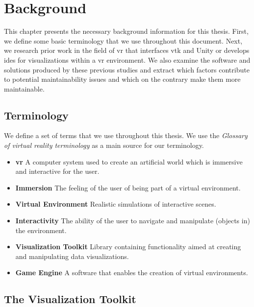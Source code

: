 \chapter{Background}
\label{ch:background}

This chapter presents the necessary background information for this thesis. First, we define some basic terminology that we use throughout this document. Next, we research prior work in the field of \acrshort{vr} that interfaces \acrshort{vtk} and Unity or develops \acrshort{ide}s for visualizations within a \acrshort{vr} environment. We also examine the software and solutions produced by these previous studies and extract which factors contribute to potential maintainability issues and which on the contrary make them more maintainable. 

\section{Terminology}

We define a set of terms that we use throughout this thesis. We use the \textit{Glossary of virtual reality terminology} \cite{manetta1995glossary} as a main source for our terminology.

\begin{itemize}[leftmargin=1.5truecm]
    \setlength{\itemindent}{-1truecm}
    \item[] \textbf{\acrfull{vr}} A computer system used to create an artificial world which is immersive and interactive for the user.
    \item[] \textbf{Immersion} The feeling of the user of being part of a virtual environment.
    \item[] \textbf{Virtual Environment} Realistic simulations of interactive scenes.
    \item[] \textbf{Interactivity} The ability of the user to navigate and manipulate (objects in) the environment.
    \item[] \textbf{Visualization Toolkit} Library containing functionality aimed at creating and manipulating data visualizations.
    \item[] \textbf{Game Engine} A software that enables the creation of virtual environments.
\end{itemize}

\section{The Visualization Toolkit}

